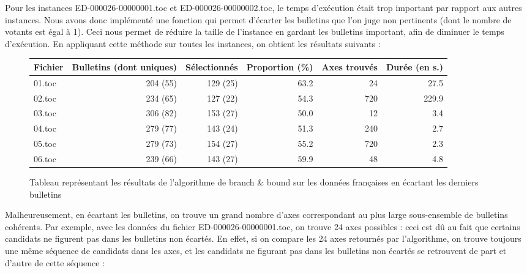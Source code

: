 \documentclass[11pt, a4paper]{article}
\begin{document}
Pour les instances ED-000026-00000001.toc et ED-000026-00000002.toc, le temps d'exécution était trop important par rapport aux autres instances. Nous avons donc implémenté une fonction qui permet d'écarter les bulletins que l'on juge non pertinents (dont le nombre de votants est égal à 1). Ceci nous permet de réduire la taille de l'instance en gardant les bulletins important, afin de diminuer le temps d'exécution. En appliquant cette méthode sur toutes les instances, on obtient les résultats suivants :

\noindent
\begin{figure}[H]
\begin{tabular}{ | p{1.4cm} | r | r | r | r | r |}
\hline
Fichier & Bulletins (dont uniques) & Sélectionnés & Proportion (\%) & Axes trouvés & Durée (en s.)\\ \hline
01.toc & 204 (55) & 129 (25) & 63.2 & 24 & 27.5 \\ \hline
02.toc & 234 (65) & 127 (22) & 54.3 & 720 & 229.9 \\ \hline
03.toc & 306 (82) & 153 (27) & 50.0 & 12 & 3.4 \\ \hline
04.toc & 279 (77) & 143 (24) & 51.3 & 240 & 2.7 \\ \hline
05.toc & 279 (73) & 154 (27) & 55.2 & 720 & 2.3 \\ \hline
06.toc & 239 (66) & 143 (27) & 59.9 & 48 & 4.8 \\ \hline
\end{tabular}
\label{BnB-results2}
\caption{Tableau représentant les résultats de l'algorithme de branch \& bound sur les données françaises en écartant les derniers bulletins}
\end{figure}

\noindent Malheureusement, en écartant les bulletins, on trouve un grand nombre d'axes correspondant au plus large sous-ensemble de bulletins cohérents. Par exemple, avec les données du fichier ED-000026-00000001.toc, on trouve 24 axes possibles : ceci est dû au fait que certains candidats ne figurent pas dans les bulletins non écartés. En effet, si on compare les 24 axes retournés par l'algorithme, on trouve toujours une même séquence de candidats dans les axes, et les candidats ne figurant pas dans les bulletins non écartés se retrouvent de part et d'autre de cette séquence :\\
\end{document}
